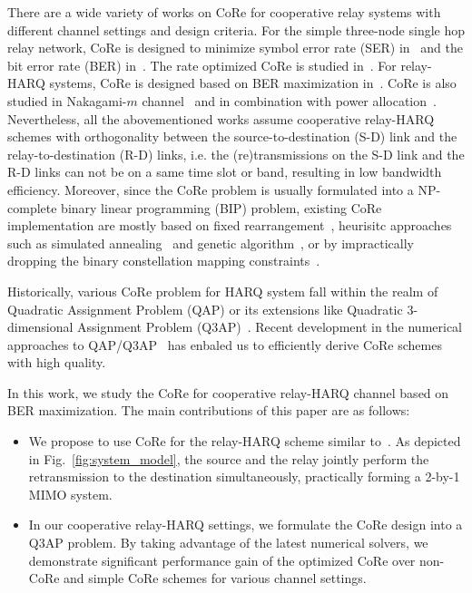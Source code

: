 \documentclass[conference]{IEEEtran}
\begin{document}
There are a wide variety of works on CoRe for cooperative relay
systems with different channel settings and design criteria.
For the simple three-node single hop relay network, CoRe is designed to minimize
symbol error rate (SER) in~\cite{seddik2008trans} and the bit error rate (BER)
in~\cite{khormuji2007improving}. The rate optimized CoRe is studied
in~\cite{khormuji2008rate}. For relay-HARQ systems, CoRe is designed based
on BER maximization in~\cite{kim2009design}. CoRe is also studied in
Nakagami-$m$ channel~\cite{ryu2011ber} and in combination with power
allocation~\cite{yu2012power}. Nevertheless, all the abovementioned
works assume cooperative relay-HARQ schemes with orthogonality between the
source-to-destination (S-D) link and the relay-to-destination (R-D) links, i.e.
the (re)transmissions on the S-D link and the R-D links can not be on a same
time slot or band, resulting in low bandwidth efficiency. Moreover, since the
CoRe problem is usually formulated into a NP-complete binary linear programming
(BIP) problem, existing CoRe implementation are mostly based on fixed
rearrangement~\cite{seddik2008trans, yu2012power}, heurisitc approaches such as
simulated annealing~\cite{khormuji2008rate} and genetic
algorithm~\cite{kim2009design}, or by impractically dropping the binary
constellation mapping constraints~\cite{sediq2011optimized}.

Historically, various CoRe problem for HARQ system fall within the realm of
Quadratic Assignment Problem (QAP) or its extensions like Quadratic
3-dimensional Assignment Problem (Q3AP)~\cite{harvind2005symbol}. Recent
development in the numerical approaches to QAP/Q3AP~\cite{mittelmann2013solving}
has enbaled us to efficiently derive CoRe schemes with high quality.

In this work, we study the CoRe for cooperative relay-HARQ channel based on BER
maximization. The main contributions of this paper are as follows:
\begin{itemize}
    \item We propose to use CoRe for the relay-HARQ scheme similar
    to~\cite{qi2011h2arq}. As depicted in Fig.~\ref{fig:system_model}, the
    source and the relay jointly perform the retransmission to the destination
    simultaneously, practically forming a 2-by-1 MIMO system.
    \item In our cooperative relay-HARQ settings, we formulate the CoRe design
    into a Q3AP problem. By taking advantage of the latest numerical solvers, we
    demonstrate significant performance gain of the optimized CoRe over non-CoRe
    and simple CoRe schemes for various channel settings.
\end{itemize}
\end{document}
